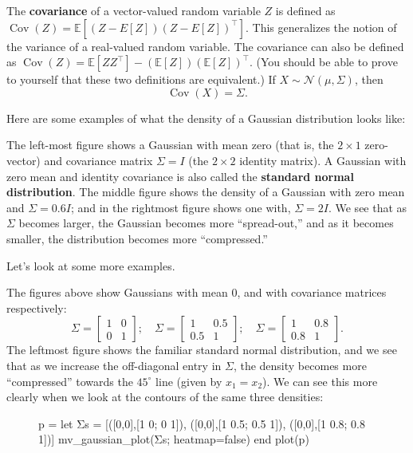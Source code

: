 The \textbf{covariance} of a vector-valued random variable $Z$ is defined as $\operatorname{Cov}(Z) =
\mathbb E[(Z - E[Z])(Z - E[Z])^\top]$. This generalizes the notion of the variance of a
real-valued random variable. The covariance can also be defined as $\operatorname{Cov}(Z) =
\mathbb E[Z Z^\top] - (\mathbb E[Z])(\mathbb E[Z])^\top$. (You should be able to prove to yourself that these
two definitions are equivalent.) If $X \sim \mathcal N(\mu,\Sigma)$, then
\begin{equation}
    \operatorname{Cov}(X) = \Sigma.
\end{equation}

Here are some examples of what the density of a Gaussian distribution
looks like:

The left-most figure shows a Gaussian with mean zero (that is, the $2\times1$
zero-vector) and covariance matrix $\Sigma = I$ (the $2\times2$ identity matrix). A
Gaussian with zero mean and identity covariance is also called the \textbf{standard normal
distribution}. The middle figure shows the density of a Gaussian with
zero mean and $\Sigma = 0.6I$; and in the rightmost figure shows one with, $\Sigma = 2I$.
We see that as $\Sigma$ becomes larger, the Gaussian becomes more ``spread-out,''
and as it becomes smaller, the distribution becomes more ``compressed.''

Let's look at some more examples.

The figures above show Gaussians with mean 0, and with covariance
matrices respectively:
\begin{equation}
    \Sigma = \begin{bmatrix}
    1 & 0\\
    0 & 1
    \end{bmatrix};\quad
    \Sigma = \begin{bmatrix}
    1 & 0.5\\
    0.5 & 1
    \end{bmatrix};\quad
    \Sigma = \begin{bmatrix}
    1 & 0.8\\
    0.8 & 1
    \end{bmatrix}.
\end{equation}
The leftmost figure shows the familiar standard normal distribution, and we
see that as we increase the off-diagonal entry in $\Sigma$, the density becomes more
``compressed'' towards the $45^\circ$ line (given by $x_1 = x_2$). We can see this more
clearly when we look at the contours of the same three densities:
\begin{figure}
    \begin{jlcode}
    p = let
        Σs = [([0,0],[1 0; 0 1]),
              ([0,0],[1 0.5; 0.5 1]),
              ([0,0],[1 0.8; 0.8 1])]
        mv_gaussian_plot(Σs; heatmap=false)
    end
    plot(p)
    \end{jlcode}
    \begin{center}
    \end{center}
\end{figure}


